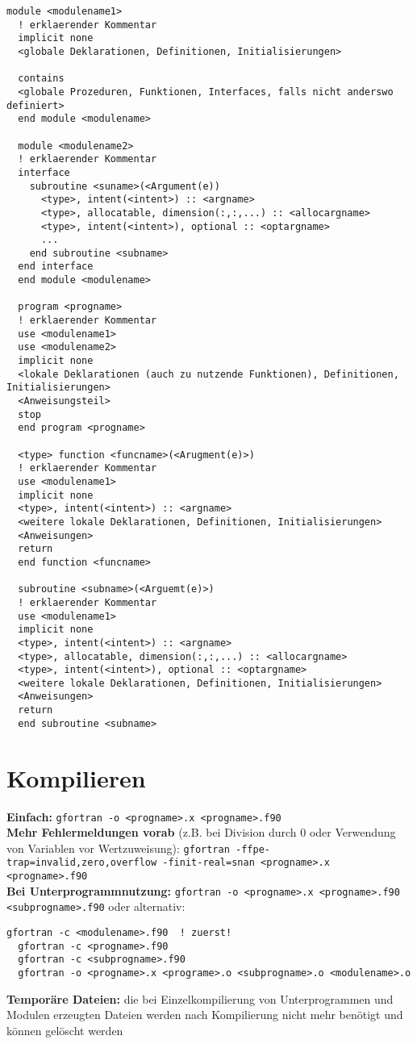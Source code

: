 \documentclass[a4paper, twocolumn]{scrarticle}
\begin{document}
\begin{lstlisting}[caption={\bfseries Dateischema Modul, Haupt- und Unterprogramme },label=code:structure]
  module <modulename1>
  ! erklaerender Kommentar
  implicit none
  <globale Deklarationen, Definitionen, Initialisierungen>
  
  contains
  <globale Prozeduren, Funktionen, Interfaces, falls nicht anderswo definiert>
  end module <modulename>
  
  module <modulename2>
  ! erklaerender Kommentar
  interface
    subroutine <suname>(<Argument(e))
      <type>, intent(<intent>) :: <argname>
      <type>, allocatable, dimension(:,:,...) :: <allocargname>
      <type>, intent(<intent>), optional :: <optargname>
      ...
    end subroutine <subname>
  end interface
  end module <modulename>
  
  program <progname>
  ! erklaerender Kommentar
  use <modulename1>
  use <modulename2>
  implicit none
  <lokale Deklarationen (auch zu nutzende Funktionen), Definitionen, Initialisierungen>
  <Anweisungsteil>
  stop
  end program <progname>
  
  <type> function <funcname>(<Arugment(e)>)
  ! erklaerender Kommentar
  use <modulename1>
  implicit none
  <type>, intent(<intent>) :: <argname>
  <weitere lokale Deklarationen, Definitionen, Initialisierungen>
  <Anweisungen>
  return
  end function <funcname>
  
  subroutine <subname>(<Arguemt(e)>)
  ! erklaerender Kommentar
  use <modulename1>
  implicit none
  <type>, intent(<intent>) :: <argname>
  <type>, allocatable, dimension(:,:,...) :: <allocargname>
  <type>, intent(<intent>), optional :: <optargname>
  <weitere lokale Deklarationen, Definitionen, Initialisierungen>
  <Anweisungen>
  return
  end subroutine <subname>
\end{lstlisting}

\section{Kompilieren}
\textbf{Einfach:} \lstinline[style=neutral]|gfortran -o <progname>.x <progname>.f90| \\
\textbf{Mehr Fehlermeldungen vorab} (z.B. bei Division durch 0 oder Verwendung von Variablen vor Wertzuweisung): \lstinline[style=neutral]|gfortran -ffpe-trap=invalid,zero,overflow -finit-real=snan <progname>.x <progname>.f90|\\
\textbf{Bei Unterprogrammnutzung:} \lstinline[style=neutral]|gfortran -o <progname>.x <progname>.f90 <subprogname>.f90| oder alternativ:
\begin{lstlisting}[style=neutral,caption={\textbf{Kompilieren von Haupt- und Unterprogrammenn}}]
  gfortran -c <modulename>.f90  ! zuerst!
  gfortran -c <progname>.f90 
  gfortran -c <subprogname>.f90 
  gfortran -o <progname>.x <programe>.o <subprogname>.o <modulename>.o
\end{lstlisting}
\textbf{Temporäre Dateien:} die bei Einzelkompilierung von Unterprogrammen und Modulen erzeugten Dateien werden nach Kompilierung nicht mehr benötigt und können gelöscht werden
\end{document}
